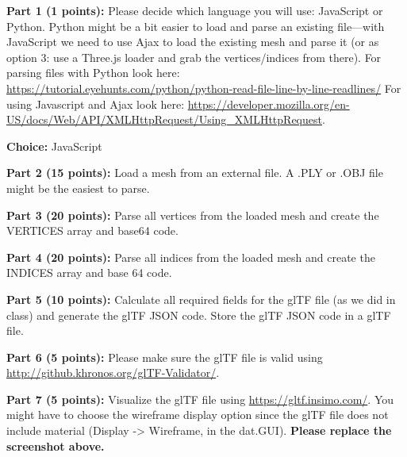 \documentclass[10pt,oneside,onecolumn,letterpaper]{article}
\begin{document}
\vspace{.5cm}


\noindent\textbf{Part 1 (1 points):} Please decide which language you will use: JavaScript or Python. Python might be a bit easier to load and parse an existing file---with JavaScript we need to use Ajax to load the existing mesh and parse it (or as option 3: use a Three.js loader and grab the vertices/indices from there). For parsing files with Python look here: \url{https://tutorial.eyehunts.com/python/python-read-file-line-by-line-readlines/} For using Javascript and Ajax look here: \url{https://developer.mozilla.org/en-US/docs/Web/API/XMLHttpRequest/Using_XMLHttpRequest}.

\vspace{.3cm}

\textbf{Choice:} JavaScript

\vspace{.5cm}

\noindent\textbf{Part 2 (15 points):} Load a mesh from an external file. A .PLY or .OBJ file might be the easiest to parse.

\vspace{.5cm}

\noindent\textbf{Part 3 (20 points):} Parse all vertices from the loaded mesh and create the VERTICES array and base64 code.

\vspace{.5cm}

\noindent\textbf{Part 4 (20 points):} Parse all indices from the loaded mesh and create the INDICES array and base 64 code.

\vspace{.5cm}

\noindent\textbf{Part 5 (10 points):} Calculate all required fields for the glTF file (as we did in class) and generate the glTF JSON code. Store the glTF JSON code in a glTF file.

\vspace{.5cm}

\noindent\textbf{Part 6 (5 points):} Please make sure the glTF file is valid using \url{http://github.khronos.org/glTF-Validator/}.

\vspace{.5cm}

\noindent\textbf{Part 7 (5 points):} Visualize the glTF file using \url{https://gltf.insimo.com/}. You might have to choose the wireframe display option since the glTF file does not include material (Display -> Wireframe, in the dat.GUI). \textbf{Please replace the screenshot above.}
\end{document}
